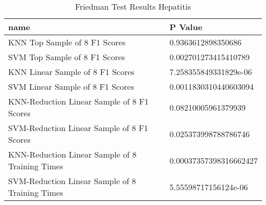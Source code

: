 \begin{table}
\centering
\caption{Friedman Test Results Hepatitis}
\label{tab:friedman_test_results_hepatitis}
\begin{tabular}{ll}
\toprule
name & P Value \\
\midrule
KNN Top Sample of 8 F1 Scores & 0.9363612898350686 \\
SVM Top Sample of 8 F1 Scores & 0.002701273415410789 \\
KNN Linear Sample of 8 F1 Scores & 7.258355849331829e-06 \\
SVM Linear Sample of 8 F1 Scores & 0.0011830310440603094 \\
KNN-Reduction Linear Sample of 8 F1 Scores & 0.08210005961379939 \\
SVM-Reduction Linear Sample of 8 F1 Scores & 0.025373998788786746 \\
KNN-Reduction Linear Sample of 8 Training Times & 0.00037357398316662427 \\
SVM-Reduction Linear Sample of 8 Training Times & 5.55598717156124e-06 \\
\bottomrule
\end{tabular}
\end{table}
